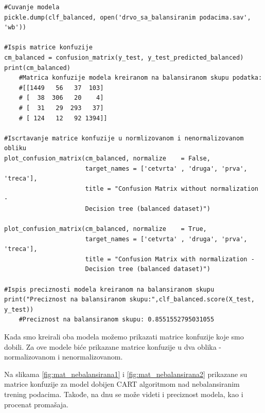 \documentclass[a4paper]{article}
\begin{document}
\begin{lstlisting}[caption={Kreiranje modela metodom drveta odlučivanja},frame=single, label=tree]
#Cuvanje modela
pickle.dump(clf_balanced, open('drvo_sa_balansiranim podacima.sav', 'wb'))

#Ispis matrice konfuzije
cm_balanced = confusion_matrix(y_test, y_test_predicted_balanced)
print(cm_balanced)
	#Matrica konfuzije modela kreiranom na balansiranom skupu podatka:
	#[[1449   56   37  103]
	# [  38  306   20    4]
	# [  31   29  293   37]
	# [ 124   12   92 1394]]

#Iscrtavanje matrice konfuzije u normlizovanom i nenormalizovanom obliku
plot_confusion_matrix(cm_balanced, normalize    = False,
                      target_names = ['cetvrta' , 'druga', 'prva', 'treca'],
                      title = "Confusion Matrix without normalization - 
                      Decision tree (balanced dataset)")

plot_confusion_matrix(cm_balanced, normalize    = True,
                      target_names = ['cetvrta' , 'druga', 'prva', 'treca'],
                      title = "Confusion Matrix with normalization - 
                      Decision tree (balanced dataset)")

#Ispis preciznosti modela kreiranom na balansiranom skupu
print("Preciznost na balansiranom skupu:",clf_balanced.score(X_test, y_test))
	#Preciznost na balansiranom skupu: 0.8551552795031055
\end{lstlisting}

Kada smo kreirali oba modela možemo prikazati matrice konfuzije koje smo dobili. Za ove modele biće prikazane matrice konfuzije u dva oblika - normalizovanom i nenormalizovanom. 

Na slikama \ref{fig:mat_nebalansirana1} i \ref{fig:mat_nebalansirana2} prikazane su matrice konfuzije za model dobijen CART algoritmom nad nebalansiranim trening podacima. Takođe, na dnu se može videti i preciznost modela, kao i procenat promašaja.
\end{document}

